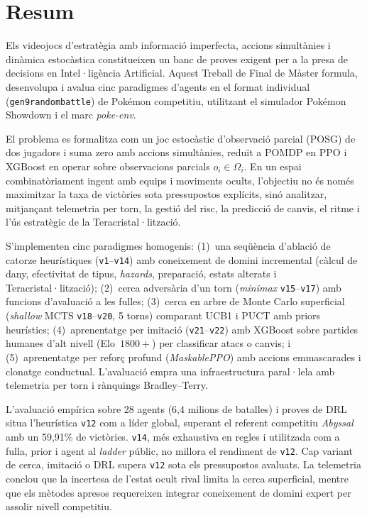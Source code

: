 \chapter*{Resum}
Els videojocs d'estratègia amb informació imperfecta, accions simultànies i dinàmica estocàstica constitueixen un banc de proves exigent per a la presa de decisions en Intel·ligència Artificial. Aquest Treball de Final de Màster formula, desenvolupa i avalua cinc paradigmes d'agents en el format individual (\texttt{gen9randombattle}) de Pokémon competitiu, utilitzant el simulador Pokémon Showdown i el marc \textit{poke-env}.

El problema es formalitza com un joc estocàstic d'observació parcial (POSG) de dos jugadors i suma zero amb accions simultànies, reduït a POMDP en PPO i XGBoost en operar sobre observacions parcials $o_i \in \Omega_i$. En un espai combinatòriament ingent amb equips i moviments ocults, l'objectiu no és només maximitzar la taxa de victòries sota pressupostos explícits, sinó analitzar, mitjançant telemetria per torn, la gestió del risc, la predicció de canvis, el ritme i l'ús estratègic de la Teracristal·lització.

S'implementen cinc paradigmes homogenis: (1)~una seqüència d'ablació de catorze heurístiques (\texttt{v1}--\texttt{v14}) amb coneixement de domini incremental (càlcul de dany, efectivitat de tipus, \emph{hazards}, preparació, estats alterats i Teracristal·lització); (2)~cerca adversària d'un torn (\emph{minimax} \texttt{v15}--\texttt{v17}) amb funcions d'avaluació a les fulles; (3)~cerca en arbre de Monte Carlo superficial (\emph{shallow} MCTS \texttt{v18}--\texttt{v20}, 5 torns) comparant UCB1 i PUCT amb priors heurístics; (4)~aprenentatge per imitació (\texttt{v21}--\texttt{v22}) amb XGBoost sobre partides humanes d'alt nivell (Elo~$1800+$) per classificar atacs o canvis; i (5)~aprenentatge per reforç profund (\emph{MaskablePPO}) amb accions emmascarades i clonatge conductual. L'avaluació empra una infraestructura paral·lela amb telemetria per torn i rànquings Bradley--Terry.

L'avaluació empírica sobre 28 agents (6,4 milions de batalles) i proves de DRL situa l'heurística \texttt{v12} com a líder global, superant el referent competitiu \textit{Abyssal} amb un 59,91\% de victòries. \texttt{v14}, més exhaustiva en regles i utilitzada com a fulla, prior i agent al \emph{ladder} públic, no millora el rendiment de \texttt{v12}. Cap variant de cerca, imitació o DRL supera \texttt{v12} sota els pressupostos avaluats. La telemetria conclou que la incertesa de l'estat ocult rival limita la cerca superficial, mentre que els mètodes apresos requereixen integrar coneixement de domini expert per assolir nivell competitiu.

